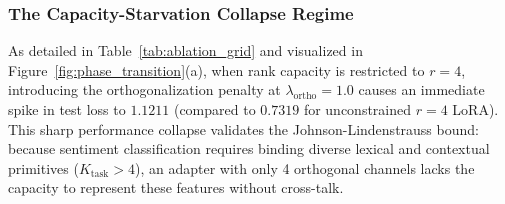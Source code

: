 \documentclass[10pt,twocolumn,letterpaper]{article}
\begin{document}
\subsubsection{The Capacity-Starvation Collapse Regime}
As detailed in Table~\ref{tab:ablation_grid} and visualized in Figure~\ref{fig:phase_transition}(a), when rank capacity is restricted to $r=4$, introducing the orthogonalization penalty at $\lambda_{\text{ortho}}=1.0$ causes an immediate spike in test loss to \textbf{$1.1211$} (compared to $0.7319$ for unconstrained $r=4$ LoRA). This sharp performance collapse validates the Johnson-Lindenstrauss bound: because sentiment classification requires binding diverse lexical and contextual primitives ($K_{\text{task}} > 4$), an adapter with only 4 orthogonal channels lacks the capacity to represent these features without cross-talk.
\end{document}
